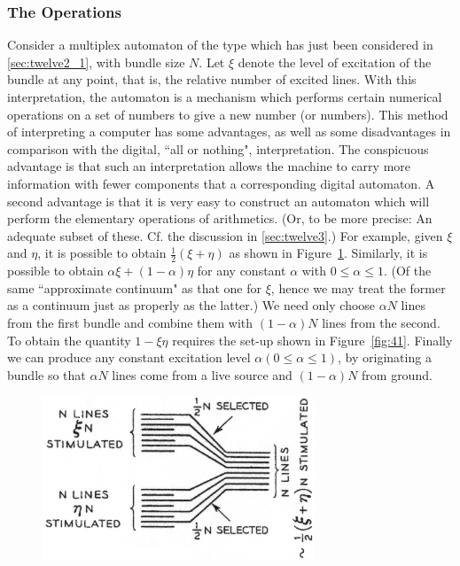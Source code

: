 \documentclass[twocolumn,preprintnumbers,amsmath,amssymb,floatfix]{revtex4}
\begin{document}
\subsubsection{\label{sec:twelve2_2}The Operations} Consider a
multiplex automaton of the type which has just been considered in
\ref{sec:twelve2_1}, with bundle size $N$. Let $\xi$ denote the
level of excitation of the bundle at any point, that is, the
relative number of excited lines. With this interpretation, the
automaton is a mechanism which performs certain numerical
operations on a set of numbers to give a new number (or numbers).
This method of interpreting a computer has some advantages, as
well as some disadvantages in comparison with the digital, ``all
or nothing", interpretation. The conspicuous advantage is that
such an interpretation allows the machine to carry more
information with fewer components that a corresponding digital
automaton. A second advantage is that it is very easy to construct
an automaton which will perform the elementary operations of
arithmetics. (Or, to be more precise: An adequate subset of these.
Cf. the discussion in \ref{sec:twelve3}.) For example, given $\xi$
and $\eta$, it is possible to obtain $\frac{1}{2}(\xi+\eta)$ as
shown in Figure~\ref{fig:40}. Similarly, it is possible to obtain
$\alpha\xi+(1-\alpha)\eta$ for any constant $\alpha$ with
$0\leq\alpha\leq1$. (Of the same ``approximate continuum" as that
one for $\xi$, hence we may treat the former as a continuum just
as properly as the latter.) We need only choose $\alpha N$ lines
from the first bundle and combine them with $(1-\alpha)N$ lines
from the second. To obtain the quantity $1-\xi\eta$ requires the
set-up shown in Figure~\ref{fig:41}. Finally we can produce any
constant excitation level $\alpha(0\leq\alpha\leq1)$, by
originating a bundle so that $\alpha N$ lines come from a live
source and $(1-\alpha)N$ from ground.

\begin{figure}
\includegraphics[width=3.2in]{fig_40}
\caption{\label{fig:40}}
\end{figure}
\end{document}
